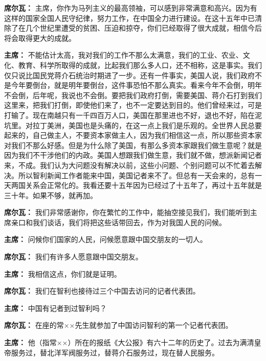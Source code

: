 \begin{list}{}
\item[\textbf{席尔瓦：}] 主席，你作为马列主义的最高领袖，可以感到非常满意和高兴。因为有这样的国家全国人民守纪律，努力工作，在中国全力进行建设。在这十五年中已清除了在几个世纪里遭受的贫困、压迫和掠夺，你们已经取得了很大成就，相信今后将会取得更大的成就。

\item[\textbf{主席：}] 不能估计太高，我对我们的工作不那么太满意，我们的工业、农业、文化、教育、科学所取得的成就，比起我们那么多人口，还不相称，这是事实。我们仅只说比国民党蒋介石统治时期进了一步。还有一件事实，美国人说，我们政府不是今年要倒台，就是明年要倒台，这件事恐怕不那么真实。看来今年不会倒，明年不会倒，后年呢，我说也不会倒。要把我们政府打倒，需要美国、蒋介石打到我们这里来，把我们打倒，即使他们来了，也不一定要达到目的。他们曾经来过，可是打输了。现在南越只有一千四百万人口，美国在那里进也不好，退也不好，陷在泥坑里。对拉丁美洲，美国也是头痛的，在这一点上我们是乐观的。全世界人民总要起来的，自己做主人，不要资本家做主人，因为我们相信这一点，所以那些资本家对我们不那么好感。但是为什么除了美国，有那么多资本家跟我们做生意呢？就是因为我们不干涉他们的内政。美国人想跟我们做生意，我们就不做，想派新闻记者来，不成。我们认为大问题没有解决以前，这些小问题、个别问题可以不忙着去解决。所以智利新闻工作者能来中国，美国记者来不了。但总有一天会来的，总有一天两国关系会正常化的。我看还要十五年因为已经过了十五年了，再过十五年就是三十年。如果不够，就再加。

\item[\textbf{席尔瓦：}] 我们非常感谢你，你在繁忙的工作中，能抽空接见我们，我们能听到主席亲口和我们谈话，我们将把这些话带回去，作为对我国人民的问候。

\item[\textbf{主席：}] 问候你们国家的人民，问候愿意跟中国交朋友的一切人。

\item[\textbf{席尔瓦：}] 我们有许多人愿意跟中国交朋友。

\item[\textbf{主席：}] 我相信这点，你们就是证明。

\item[\textbf{席尔瓦：}] 我们在智利也接待过三个中国去访问的记者代表团。

\item[\textbf{主席：}] 中国有记者到过智利吗？

\item[\textbf{席尔瓦：}] 在座的常××先生就参加了中国访问智利的第一个记者代表团。

\item[\textbf{主席：}] 他（指常××）所在的报纸《大公报》有六十二年的历史了。过去为满清皇帝服务过，替北洋军阀服务过，替蒋介石服务过，现在替人民服务。


\end{list}
